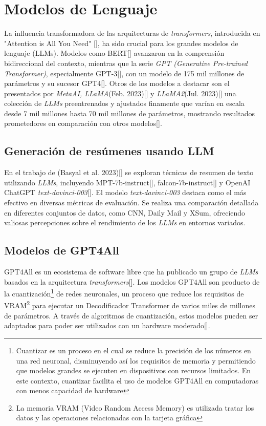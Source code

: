 \section{Modelos de Lenguaje}
   
    La influencia transformadora de las arquitecturas de \emph{transformers}, introducida en "Attention is All You Need" [\cite{attention}], ha sido crucial para los grandes modelos de lenguaje (LLMs). Modelos como BERT[\cite{BERT}] avanzaron en la comprensión bidireccional del contexto, mientras que la serie \emph{GPT (Generative Pre-trained Transformer)}, especialmente GPT-3[\cite{brown2020language}], con un modelo de 175 mil millones de parámetros y su sucesor GPT4[\cite{openai2023gpt4}]. Otros de los modelos a destacar son el presentados por \emph{MetaAI, LLaMA}(Feb. 2023)[\cite{llamapaper}] y \emph{LLaMA2}(Jul. 2023)[\cite{llamapaper2}] una colección de \emph{LLMs} preentrenados y ajustados finamente que varían en escala desde 7 mil millones hasta 70 mil millones de parámetros, mostrando resultados prometedores en comparación con otros modelos[\cite{metallama}]. 
    
    \subsection{Generación de resúmenes usando LLM}

    En el trabajo de (Basyal et al. 2023)[\cite{basyal2023text}] se exploran técnicas de resumen de texto utilizando \emph{LLMs}, incluyendo MPT-7b-instruct[\cite{mpt}], falcon-7b-instruct[\cite{falcon}] y OpenAI ChatGPT \emph{text-davinci-003}[\cite{brown2020language}]. El modelo \emph{text-davinci-003} destaca como el más efectivo en diversas métricas de evaluación. Se realiza una comparación detallada en diferentes conjuntos de datos, como CNN, Daily Mail y XSum, ofreciendo valiosas percepciones sobre el rendimiento de los \emph{LLMs} en entornos variados. 

    \subsection{Modelos de GPT4All}

        GPT4All es un ecosistema de software libre que ha publicado un grupo de \emph{LLMs} basados en la arquitectura \emph{transformers}[\cite{attention}]. Los modelos GPT4All son producto de la cuantización\footnote{Cuantizar es un proceso en el cual se reduce la precisión de los números en una red neuronal, disminuyendo así los requisitos de memoria y permitiendo que modelos grandes se ejecuten en dispositivos con recursos limitados. En este contexto, cuantizar facilita el uso de modelos GPT4All en computadoras con menos capacidad de hardware} de redes neuronales, un proceso que reduce los requisitos de VRAM\footnote{La memoria VRAM (Video Random Access Memory) es utilizada tratar los datos y las operaciones relacionadas con la tarjeta gráfica} para ejecutar un Decodificador Transformer de varios miles de millones de parámetros. A través de algoritmos de cuantización, estos modelos pueden ser adaptados para poder ser utilizados con un hardware moderado[\cite{webgpt4all}].
        
